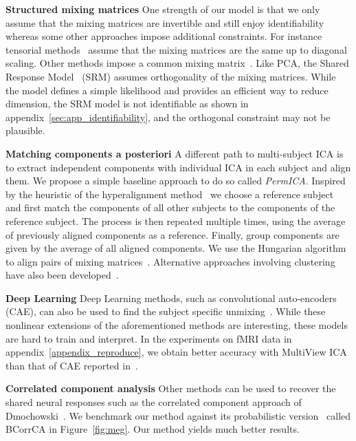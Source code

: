 \documentclass[12pt]{report}
\begin{document}
\textbf{Structured mixing matrices} One strength of our model is that we only assume that the mixing matrices are invertible and still enjoy identifiability whereas some other approaches impose additional constraints. For instance tensorial methods~\cite{beckmann2005tensorial} assume that the mixing matrices are the same up to diagonal scaling.
%
Other methods impose a common mixing matrix~\cite{cong2013validating, grin2010independent, calhoun2001fmri, Monti18UAI}. Like PCA, the Shared Response Model~\cite{chen2015reduced} (SRM) assumes orthogonality of the mixing matrices. While the model defines a simple likelihood and provides an efficient way to reduce dimension, the SRM model is not identifiable as shown in appendix~\ref{sec:app_identifiability}, and the orthogonal constraint may not be plausible.
%

\textbf{Matching components a posteriori} A different path to multi-subject ICA is to extract independent components with individual ICA in each subject and align them. We propose a simple baseline approach to do so called \emph{PermICA}.
Inspired by the heuristic of the hyperalignment method~\cite{haxby2011common} we choose a reference subject and first match the components of all other subjects to the components of the reference subject. The process is then repeated multiple times, using the average of previously aligned components as a reference. Finally, group components are given by the average of all aligned components. We use the Hungarian algorithm to align pairs of mixing matrices~\cite{tichavsky2004optimal}.
%
Alternative approaches involving clustering have also been developed~\cite{esposito2005independent,bigdely2013measure}.

\textbf{Deep Learning} Deep Learning methods, such as convolutional auto-encoders (CAE), can also be used to find the subject specific unmixing~\cite{chen2016convolutional}. While these nonlinear extensions of the aforementioned methods are interesting, these models are hard to train and interpret. In the experiments on fMRI data in appendix~\ref{appendix_reproduce}, we obtain better accuracy with MultiView ICA than that of CAE reported in~\cite{chen2016convolutional}.

\textbf{Correlated component analysis} Other methods can be used to recover the shared neural responses such as the correlated component approach of Dmochowski~\cite{dmochowski2012correlated}. We benchmark our method against its probabilistic version~\cite{kamronn2015multiview} called BCorrCA in Figure~\ref{fig:meg}. Our method yields much better results. 
\end{document}
